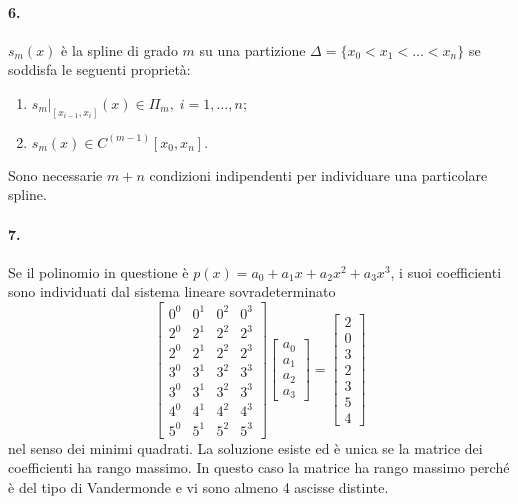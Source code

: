 \paragraph{6.} $s_m(x)$ è la spline di grado $m$ su una partizione $\Delta=\{x_0<x_1<\hdots<x_n\}$ se soddisfa le seguenti proprietà:
\begin{enumerate}
    \item $s_m|_{[x_{i-1},x_i]}(x)\in\Pi_m,\; i=1,\hdots,n$;
    \item $s_m(x)\in C^{(m-1)}[x_0,x_n].$
\end{enumerate}

\noindent Sono necessarie $m+n$ condizioni indipendenti per individuare una particolare spline.

\paragraph{7.} Se il polinomio in questione è $p(x)=a_0 + a_1x + a_2x^2 + a_3x^3$, i suoi coefficienti sono individuati dal sistema lineare sovradeterminato
\begin{equation*}
    \begin{bmatrix}
        0^0 & 0^1 & 0^2 & 0^3\\
        2^0 & 2^1 & 2^2 & 2^3 \\
        2^0 & 2^1 & 2^2 & 2^3 \\
        3^0 & 3^1 & 3^2 & 3^3 \\
        3^0 & 3^1 & 3^2 & 3^3 \\
        4^0 & 4^1 & 4^2 & 4^3 \\
        5^0 & 5^1 & 5^2 & 5^3
    \end{bmatrix}
    \begin{bmatrix}
        a_0\\
        a_1\\
        a_2\\
        a_3
    \end{bmatrix} = 
    \begin{bmatrix}
        2\\
        0\\
        3\\
        2\\
        3\\
        5\\
        4
    \end{bmatrix}
\end{equation*}
nel senso dei minimi quadrati. La soluzione esiste ed è unica se la matrice dei coefficienti ha rango massimo. In questo caso la matrice ha rango massimo perché è del tipo di Vandermonde e vi sono almeno 4 ascisse distinte.


